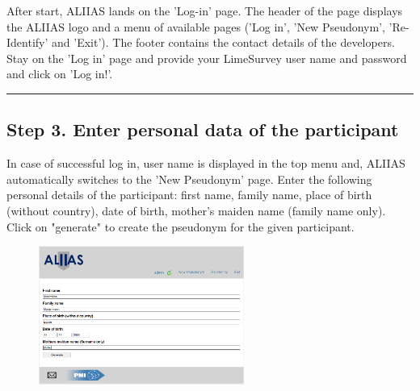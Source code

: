 After start, ALIIAS lands on the 'Log-in' page.
The header of the page displays the ALIIAS logo and a menu of available pages ('Log in', 'New Pseudonym', 'Re-Identify' and 'Exit'). The footer contains the contact details of the developers.
Stay on the 'Log in' page and provide your LimeSurvey user name and password and click on 'Log in!'.

\small\setlength\fboxsep{5pt}\setlength\fboxrule{1pt}

\small\setlength\fboxsep{5pt}\setlength\fboxrule{1pt}
\large

\par\noindent\rule{\textwidth\color{pniblue}}{0.4pt}
\subsection*{Step 3. Enter personal data of the participant}

In case of successful log in, user name is displayed in the top menu and, ALIIAS automatically switches to the 'New Pseudonym' page. Enter the following personal details of the participant: first name, family name, place of birth (without country), date of birth, mother's maiden name (family name only). Click on "generate" to create the pseudonym for the given participant.

\begin{figure}[H]
\includegraphics[width=0.6\textwidth]{docs/fig/03_filled.PNG}
\end{figure}

